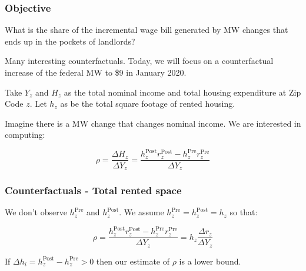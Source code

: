 \documentclass[aspectratio=169]{beamer}
\begin{document}
\begin{frame}
    \frametitle{Objective}
    
    
    What is the share of the incremental wage bill generated by MW changes that ends up 
    in the pockets of landlords? 
    
    \pause
    
    Many interesting counterfactuals. Today, we will focus on a counterfactual increase of the 
    federal MW to \$9 in January 2020.
    
    \pause 
   
    Take $Y_z$ and $H_z$ as the total nominal income and total housing expenditure at Zip Code $z$. Let $h_z$ as  be the total square footage of rented housing. 
   
   Imagine there is a MW change that changes nominal income. We are interested in computing:
   
   \begin{equation}
   	    \rho = \frac{\Delta H_z}{\Delta Y_z} = \frac{h^{\text{Post}}_z r^{\text{Post}}_z - h^{\text{Pre}}_z r^{\text{Pre}}_z}{\Delta Y_z}
   \end{equation}
   
\end{frame}

\begin{frame}
    \frametitle{Counterfactuals - Total rented space}
    We don't observe $h^{\text{Pre}}_z$ and $h^{\text{Post}}_z $. We assume $h^{\text{Pre}}_z = h^{\text{Post}}_z = h_z$ so that:
    
    \[
    \rho = \frac{h^{\text{Post}}_z r^{\text{Post}}_z - h^{\text{Pre}}_z r^{\text{Pre}}_z }{\Delta Y_z} = h_z \frac{\Delta r_z}{\Delta Y_z}
    \]
   
   If $\Delta h_i = h^{\text{Post}}_z - h^{\text{Pre}}_z > 0$ then our estimate of $\rho$ is a lower bound.
\end{frame}
\end{document}
